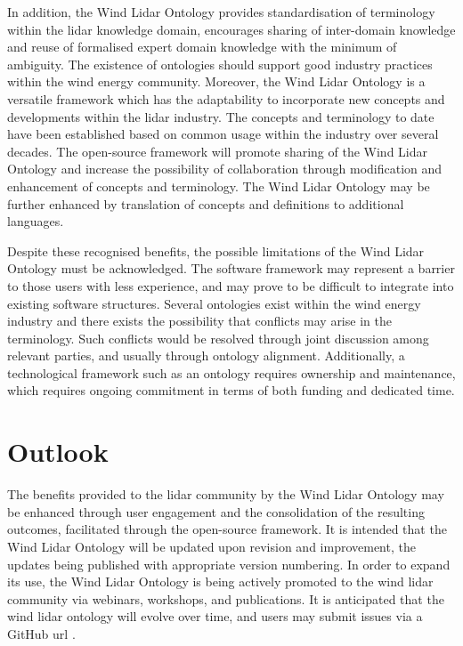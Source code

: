 \documentclass[remotesensing,article,submit,pdftex,moreauthors]{Definitions/mdpi}
\begin{document}
In addition, the Wind Lidar Ontology provides standardisation of terminology within the lidar knowledge domain, encourages sharing of inter-domain knowledge and reuse of formalised expert domain knowledge with the minimum of ambiguity. The existence of ontologies should support good industry practices within the wind energy community. Moreover, the Wind Lidar Ontology is a versatile framework which has the adaptability to incorporate new concepts and developments within the lidar industry.
The concepts and terminology to date have been established based on common usage within the industry over several decades.
The open-source framework will promote sharing of the Wind Lidar Ontology and increase the possibility of collaboration through modification and enhancement of concepts and terminology. 
The Wind Lidar Ontology may be further enhanced by translation of concepts and definitions to additional languages.

Despite these recognised benefits, the possible limitations of the Wind Lidar Ontology must be acknowledged.
The software framework may represent a barrier to those users with less experience, and may prove to be difficult to integrate into existing software structures.
Several ontologies exist within the wind energy industry and there exists the possibility that conflicts may arise in the terminology. Such conflicts would be resolved through joint discussion among relevant parties, and usually through ontology alignment.
Additionally, a technological framework such as an ontology requires ownership and maintenance, which requires ongoing commitment in terms of both funding and dedicated time.

\section{Outlook}
\label{sec:Outlook}
The benefits provided to the lidar community by the Wind Lidar Ontology may be enhanced through user engagement and the consolidation of the resulting outcomes, facilitated through the open-source framework.
It is intended that the Wind Lidar Ontology will be updated upon revision and improvement, the updates being published with appropriate version numbering.
In order to expand its use, the Wind Lidar Ontology is being actively promoted to the wind lidar community via webinars, workshops, and publications.
It is anticipated that the wind lidar ontology will evolve over time, and users may submit issues via a
GitHub url \cite{ref-Extract-Wind-Lidar-Ontology-concepts}.
\end{document}
